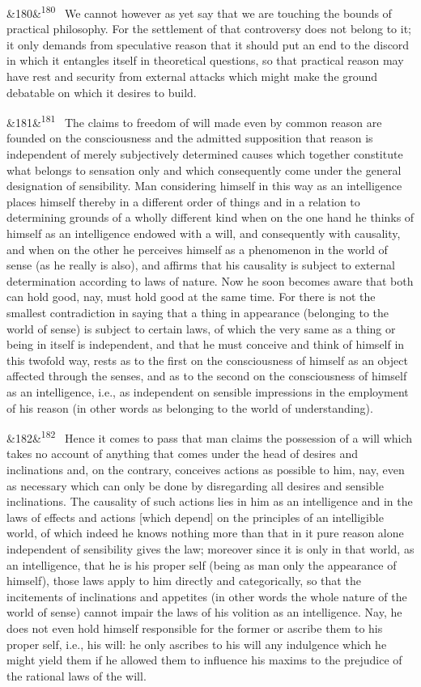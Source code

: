 \documentclass[12pt]{article}
\newcommand{\para}[1][]{\par\noindent\ifx&#1&\else\textsuperscript{\footnotesize #1}~\fi}
\begin{document}
\para[180] We cannot however as yet say that we are touching the bounds of practical philosophy. For the settlement of that controversy does not belong to it; it only demands from speculative reason that it should put an end to the discord in which it entangles itself in theoretical questions, so that practical reason may have rest and security from external attacks which might make the ground debatable on which it desires to build.

\para[181] The claims to freedom of will made even by common reason are founded on the consciousness and the admitted supposition that reason is independent of merely subjectively determined causes which together constitute what belongs to sensation only and which consequently come under the general designation of sensibility. Man considering himself in this way as an intelligence places himself thereby in a different order of things and in a relation to determining grounds of a wholly different kind when on the one hand he thinks of himself as an intelligence endowed with a will, and consequently with causality, and when on the other he perceives himself as a phenomenon in the world of sense (as he really is also), and affirms that his causality is subject to external determination according to laws of nature. Now he soon becomes aware that both can hold good, nay, must hold good at the same time. For there is not the smallest contradiction in saying that a thing in appearance (belonging to the world of sense) is subject to certain laws, of which the very same as a thing or being in itself is independent, and that he must conceive and think of himself in this twofold way, rests as to the first on the consciousness of himself as an object affected through the senses, and as to the second on the consciousness of himself as an intelligence, i.e., as independent on sensible impressions in the employment of his reason (in other words as belonging to the world of understanding).

\para[182] Hence it comes to pass that man claims the possession of a will which takes no account of anything that comes under the head of desires and inclinations and, on the contrary, conceives actions as possible to him, nay, even as necessary which can only be done by disregarding all desires and sensible inclinations. The causality of such actions lies in him as an intelligence and in the laws of effects and actions [which depend] on the principles of an intelligible world, of which indeed he knows nothing more than that in it pure reason alone independent of sensibility gives the law; moreover since it is only in that world, as an intelligence, that he is his proper self (being as man only the appearance of himself), those laws apply to him directly and categorically, so that the incitements of inclinations and appetites (in other words the whole nature of the world of sense) cannot impair the laws of his volition as an intelligence. Nay, he does not even hold himself responsible for the former or ascribe them to his proper self, i.e., his will: he only ascribes to his will any indulgence which he might yield them if he allowed them to influence his maxims to the prejudice of the rational laws of the will.
\end{document}
